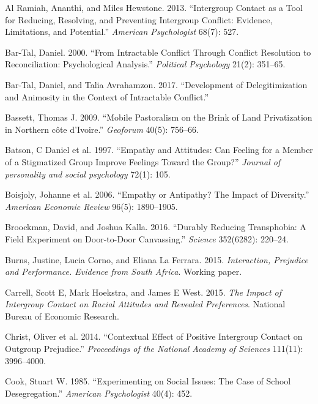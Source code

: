 \documentclass[11pt]{article}
\begin{document}
\leavevmode\hypertarget{ref-al2013intergroup}{}%
Al Ramiah, Ananthi, and Miles Hewstone. 2013. ``Intergroup Contact as a
Tool for Reducing, Resolving, and Preventing Intergroup Conflict:
Evidence, Limitations, and Potential.'' \emph{American Psychologist}
68(7): 527.

\leavevmode\hypertarget{ref-bar2000intractable}{}%
Bar-Tal, Daniel. 2000. ``From Intractable Conflict Through Conflict
Resolution to Reconciliation: Psychological Analysis.'' \emph{Political
Psychology} 21(2): 351--65.

\leavevmode\hypertarget{ref-bar2017development}{}%
Bar-Tal, Daniel, and Talia Avrahamzon. 2017. ``Development of
Delegitimization and Animosity in the Context of Intractable Conflict.''

\leavevmode\hypertarget{ref-bassett2009mobile}{}%
Bassett, Thomas J. 2009. ``Mobile Pastoralism on the Brink of Land
Privatization in Northern côte d'Ivoire.'' \emph{Geoforum} 40(5):
756--66.

\leavevmode\hypertarget{ref-batson1997empathy}{}%
Batson, C Daniel et al. 1997. ``Empathy and Attitudes: Can Feeling for a
Member of a Stigmatized Group Improve Feelings Toward the Group?''
\emph{Journal of personality and social psychology} 72(1): 105.

\leavevmode\hypertarget{ref-boisjoly2006empathy}{}%
Boisjoly, Johanne et al. 2006. ``Empathy or Antipathy? The Impact of
Diversity.'' \emph{American Economic Review} 96(5): 1890--1905.

\leavevmode\hypertarget{ref-broockman2016durably}{}%
Broockman, David, and Joshua Kalla. 2016. ``Durably Reducing
Transphobia: A Field Experiment on Door-to-Door Canvassing.''
\emph{Science} 352(6282): 220--24.

\leavevmode\hypertarget{ref-burns2015interaction}{}%
Burns, Justine, Lucia Corno, and Eliana La Ferrara. 2015.
\emph{Interaction, Prejudice and Performance. Evidence from South
Africa}. Working paper.

\leavevmode\hypertarget{ref-carrell2015impact}{}%
Carrell, Scott E, Mark Hoekstra, and James E West. 2015. \emph{The
Impact of Intergroup Contact on Racial Attitudes and Revealed
Preferences}. National Bureau of Economic Research.

\leavevmode\hypertarget{ref-christ2014contextual}{}%
Christ, Oliver et al. 2014. ``Contextual Effect of Positive Intergroup
Contact on Outgroup Prejudice.'' \emph{Proceedings of the National
Academy of Sciences} 111(11): 3996--4000.

\leavevmode\hypertarget{ref-cook1985experimenting}{}%
Cook, Stuart W. 1985. ``Experimenting on Social Issues: The Case of
School Desegregation.'' \emph{American Psychologist} 40(4): 452.
\end{document}
